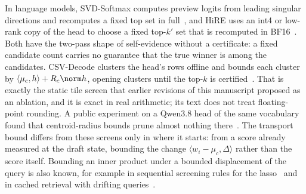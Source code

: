 In language models, SVD-Softmax computes preview logits from leading singular directions and recomputes a fixed top set in full~\cite{svdsoftmax}, and HiRE uses an int4 or low-rank copy of the head to choose a fixed top-$k'$ set that is recomputed in BF16~\cite{hire}. Both have the two-pass shape of self-evidence without a certificate: a fixed candidate count carries no guarantee that the true winner is among the candidates. CSV-Decode clusters the head's rows offline and bounds each cluster by $\langle\mu_c,h\rangle+R_c\norm h$, opening clusters until the top-$k$ is certified~\cite{csvdecode}. That is exactly the static tile screen that earlier revisions of this manuscript proposed as an ablation, and it is exact in real arithmetic; its text does not treat floating-point rounding. A public experiment on a Qwen3.8 head of the same vocabulary found that centroid-radius bounds prune almost nothing there~\cite{e142}. The transport bound differs from these screens only in where it starts: from a score already measured at the draft state, bounding the change $\langle w_i-\mu_c,\Delta\rangle$ rather than the score itself. Bounding an inner product under a bounded displacement of the query is also known, for example in sequential screening rules for the lasso~\cite{dppscreening} and in cached retrieval with drifting queries~\cite{frieder2024}.

